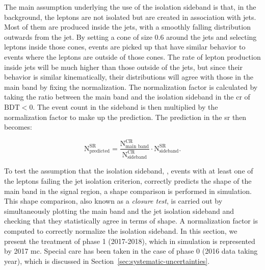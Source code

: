 The main assumption underlying the use of the isolation sideband is that, in the background, the leptons are not isolated but are created in association with jets. Most of them are produced inside the jets, with a smoothly falling distribution outwards from the jet. By setting a cone of size 0.6 around the jets and selecting leptons inside those cones, events are picked up that have similar behavior to events where the leptons are outside of those cones. The rate of lepton production inside jets will be much higher than those outside of the jets, but since their behavior is similar kinematically, their distributions will agree with those in the main band by fixing the normalization. The normalization factor is calculated by taking the ratio between the main band and the isolation sideband in the \gls{cr} of $\mathrm{BDT}<0$. The event count in the sideband is then multiplied by the normalization factor to make up the prediction. The prediction in the \gls{sr} then becomes:

\begin{equation}
\mathrm{N}^{\mathrm{SR}}_{\text{predicted}} = \frac{\mathrm{N}^{\mathrm{CR}}_{\text{main band}}}{\mathrm{N}^{\mathrm{CR}}_{\text{sideband}}} \cdot\mathrm{N}^{\mathrm{SR}}_{\text{sideband}}.
\end{equation}

To test the assumption that the isolation sideband, \ie, events with at least one of the leptons failing the jet isolation criterion, correctly predicts the shape of the main band in the signal region, a shape comparison is performed in simulation. This shape comparison, also known as a \emph{closure test}, is carried out by simultaneously plotting the main band and the jet isolation sideband and checking that they statistically agree in terms of shape. A normalization factor is computed to correctly normalize the isolation sideband. In this section, we present the treatment of phase 1 (2017-2018), which in simulation is represented by 2017 \gls{mc}. Special care has been taken in the case of phase 0 (2016 data taking year), which is discussed in Section~\ref{sec:systematic-uncertainties}.


